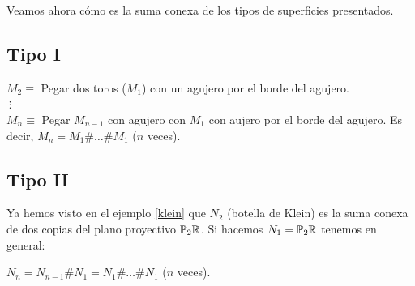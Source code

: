 \documentclass[GTSResumen.tex]{subfiles}
\begin{document}

Veamos ahora cómo es la suma conexa de los tipos de superficies presentados.

\subsection{Tipo I}

\begin{flushleft}
$M_2\equiv$ Pegar dos toros ($M_1$) con un agujero por el borde del agujero.\\
$\ \vdots$\\
$M_n\equiv$ Pegar $M_{n-1}$ con agujero con $M_1$ con aujero por el borde del agujero. Es decir, $M_n=M_1\#\dots\# M_1$  ($n$ veces).
\end{flushleft}


\subsection{Tipo II}

Ya hemos visto en el ejemplo \ref{klein} que $N_2$ (botella de Klein) es la suma conexa de dos copias del plano proyectivo $\mathbb{P}_2\mathbb{R}$. Si hacemos $N_1=\mathbb{P}_2\mathbb{R}$ tenemos en general:

\begin{flushleft}
$N_n=N_{n-1}\#N_1=N_1\#\dots\# N_1$ ($n$ veces).


\end{flushleft}
\end{document}
